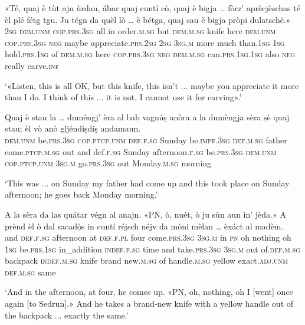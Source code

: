\begin{linenumbers}
	\gll «Té, quaj è tùt ajn ùrdan, ábar quaj cuntí cò, quaj è bigja … fòrz’ aprècjèschas té èl plé fétg tgu. Ju tégn da quèl lò … è bétga, quaj sau è bigja pròpi dulatschè.»\\
	\textsc{2sg} \textsc{dem.unm} \textsc{cop.prs.3sg} all in order.\textsc{m.sg} but \textsc{dem.m.sg} knife here \textsc{dem.unm} \textsc{cop.prs.3sg} \textsc{neg} {} maybe appreciate.\textsc{prs.2sg} \textsc{2sg} \textsc{3sg.m} more much than.\textsc{1sg} \textsc{1sg} hold.\textsc{prs.1sg} of \textsc{dem.m.sg} here {} \textsc{cop.prs.3sg} \textsc{neg} \textsc{dem.m.sg} can.\textsc{prs.1sg.1sg} also \textsc{neg} really carve.\textsc{inf}\\
\end{linenumbers}
\medskip
\glt `«Listen, this is all OK, but this knife, this isn't ... maybe you appreciate it more than I do. I think of this ... it is not, I cannot use it for carving».' 
\medskip

\begin{linenumbers}
	\gll Quaj è stau la … duméngj’ èra al bab vagnúṣ anòra\footnotemark{} a la dumèngja sèra ṣè quaj stau; èl vò anò gljéndiṣdíṣ andamaun.\\
	\textsc{dem.unm} be.\textsc{prs.3sg} \textsc{cop.ptcp.unm} \textsc{def.f.sg} {} Sunday be.\textsc{impf.3sg} \textsc{def.m.sg} father come.\textsc{ptcp.m.sg} out and def.\textsc{f.sg} Sunday afternoon.\textsc{f.sg} be.\textsc{prs.3sg} \textsc{dem.unm} \textsc{cop.ptcp.unm} \textsc{3sg.m} go.\textsc{prs.3sg} out Monday.\textsc{m.sg} morning\\
\end{linenumbers}
\medskip
\glt `This was ... on Sunday my father had come up and this took place on Sunday afternoon; he goes back Monday morning.'
\medskip

\begin{linenumbers}
	\gll A la sèra da las quátar végn al anajn. «PN, ò, nuét, ò ju sùn aun\footnotemark{} in' jèda.» A prènd èl ò dal sacadò̱s in cuntí réjsch néjv da mòni mèlan … èxáct al madèm.\\
	and \textsc{def.f.sg} afternoon at \textsc{def.f.pl} four come.\textsc{prs.3sg} \textsc{3sg.m} in \textsc{pn} oh nothing oh \textsc{1sg} be.\textsc{prs.1sg} in\_addition \textsc{indef.f.sg} time and take.\textsc{prs.3sg} \textsc{3sg.m} out of.\textsc{def.m.sg} backpack \textsc{indef.m.sg} knife brand new.\textsc{m.sg} of handle.\textsc{m.sg} yellow {} exact.\textsc{adj.unm} \textsc{def.m.sg} same\\
\end{linenumbers}
\medskip
\glt `And in the afternoon, at four, he comes up. «PN, oh, nothing, oh I [went] once again [to Sedrun].» And he takes a brand-new knife with a yellow handle out of the backpack ... exactly the same.'
\medskip


